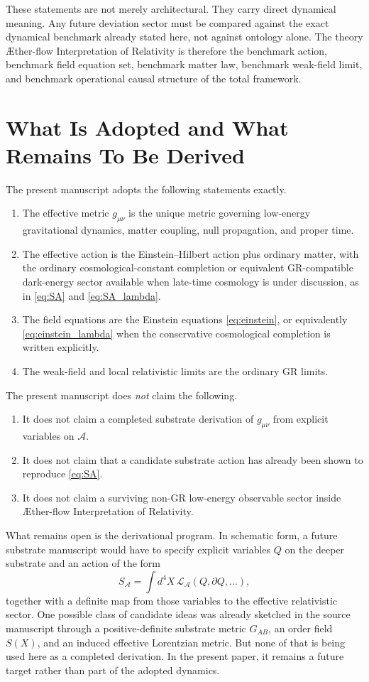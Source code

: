 \documentclass[11pt]{article}
\newcommand{\Aflow}{\AE{}ther-flow}
\newcommand{\TheoryName}{\Aflow{} Interpretation of Relativity}
\newcommand{\Sub}{\mathcal{A}}
\begin{document}
These statements are not merely architectural. They carry direct dynamical meaning. Any future deviation sector must be compared against the exact dynamical benchmark already stated here, not against ontology alone. The theory \TheoryName{} is therefore the benchmark action, benchmark field equation set, benchmark matter law, benchmark weak-field limit, and benchmark operational causal structure of the total framework.

\section{What Is Adopted and What Remains To Be Derived}

The present manuscript adopts the following statements exactly.
\begin{enumerate}
    \item The effective metric \(g_{\mu\nu}\) is the unique metric governing low-energy gravitational dynamics, matter coupling, null propagation, and proper time.
    \item The effective action is the Einstein--Hilbert action plus ordinary matter, with the ordinary cosmological-constant completion or equivalent GR-compatible dark-energy sector available when late-time cosmology is under discussion, as in \eqref{eq:SA} and \eqref{eq:SA_lambda}.
    \item The field equations are the Einstein equations \eqref{eq:einstein}, or equivalently \eqref{eq:einstein_lambda} when the conservative cosmological completion is written explicitly.
    \item The weak-field and local relativistic limits are the ordinary GR limits.
\end{enumerate}

The present manuscript does \emph{not} claim the following.
\begin{enumerate}
    \item It does not claim a completed substrate derivation of \(g_{\mu\nu}\) from explicit variables on \(\Sub\).
    \item It does not claim that a candidate substrate action has already been shown to reproduce \eqref{eq:SA}.
    \item It does not claim a surviving non-GR low-energy observable sector inside \TheoryName{}.
\end{enumerate}

What remains open is the derivational program. In schematic form, a future substrate manuscript would have to specify explicit variables \(Q\) on the deeper substrate and an action of the form
\begin{equation}
S_{\Sub}
=
\int d^4X\,\mathcal{L}_{\Sub}(Q,\partial Q,\ldots),
\label{eq:substrateaction}
\end{equation}
together with a definite map from those variables to the effective relativistic sector. One possible class of candidate ideas was already sketched in the source manuscript through a positive-definite substrate metric \(G_{AB}\), an order field \(S(X)\), and an induced effective Lorentzian metric. But none of that is being used here as a completed derivation. In the present paper, it remains a future target rather than part of the adopted dynamics.
\end{document}
